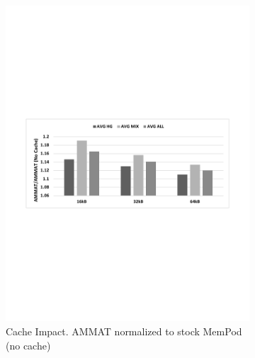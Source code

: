 \begin{figure}[h]
	\begin{subfigure}{\linewidth}
    	\includegraphics[width=\linewidth]{figures/revised/new/cache_impact.pdf}
    	\caption{Cache Impact. AMMAT normalized to stock MemPod (no cache) \\ \hfill}\label{fig:cache_impact}
	\end{subfigure}
	\begin{subfigure}[b]{\linewidth}

\end{subfigure}
\end{figure}
